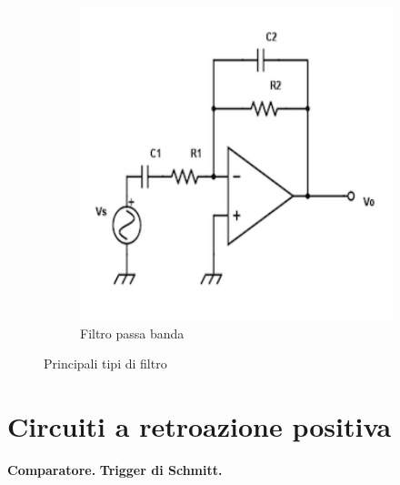 \documentclass[a4paper,portrait,12pt]{article}
\theoremstyle{definition}
\begin{document}
\begin{figure}[H]
\begin{subfigure}{.5\textwidth}
\end{subfigure}
\begin{subfigure}{.5\textwidth}
\centering
\includegraphics[width=.5\linewidth]{img/passabanda.pdf}
\caption{Filtro passa banda}
\label{fig:passabanda}
\end{subfigure}
\caption{Principali tipi di filtro}
\end{figure}

\section{Circuiti a retroazione positiva}

\textbf{Comparatore.}
\textbf{Trigger di Schmitt.}
\end{document}
